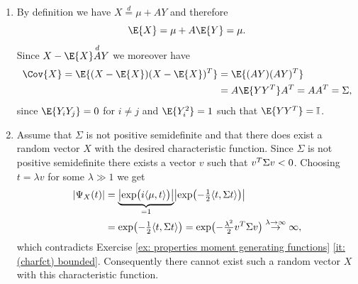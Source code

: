 \begin{solution}
\begin{enumerate}[wide=0pt, noitemsep]
    \item[\ref{it: (multivariate normal distribution) mean and covariance}]
    By definition we have \(X \overset{d}= \mu + A Y\) and therefore
    \[
        \E{X} = \mu + A \E{Y} = \mu.
    \]
    Since \(X-\E{X} \overset{d} AY\) we moreover have
    \begin{align*}
        \Cov{X} = \E{(X-\E{X})(X-\E{X})^\transpose}
        &= \E{(A Y)(A Y)^\transpose}
        \\
        &= A \E{Y Y^\transpose} A^\transpose
        = A A^\transpose
        = \Sigma,
    \end{align*}
    since \(\E{Y_i Y_j} = 0\) for \(i \neq j\) and \(\E{Y_i^2} = 1\)
    such that \(\E{Y Y^\transpose} = \identity\).
    
    \item[\ref{it: (multivariate normal distribution) non-positive semidefinite}]
    Assume that \(\Sigma\) is not positive semidefinite and that there
    does exist a random vector \(X\) with the desired characteristic function.
    Since \(\Sigma\) is not positive semidefinite there exists    a vector \(v\)
    such that \(v^\transpose \Sigma v < 0\). Choosing \(t = \lambda v\) for some
    \(\lambda \gg 1\) we get
    \begin{align*}
        \abs{\charFct_X(t)}
        &= \underbrace{\abs[\big]{\exp\bigl(i\scp{\mu, t}\bigr)}}_{=1}\abs[\big]{\exp\bigl(-\tfrac12 \scp{t, \Sigma t}\bigr)}
        \\
        &= \exp\bigl(-\tfrac12 \scp{t, \Sigma t}\bigr)
        = \exp\bigl(-\tfrac{\lambda^2}2 v^\transpose \Sigma v\bigr)
        \overset{\lambda \to \infty}\to \infty,
    \end{align*}
    which contradicts Exercise \ref{ex: properties moment generating functions} \ref{it: (charfct) bounded}.
    Consequently there cannot exist such a random vector \(X\)
    with this characteristic function.
    \qedhere
\end{enumerate}
\end{solution}
